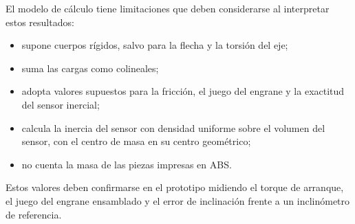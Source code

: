 \documentclass[../../General.tex]{subfiles}
\begin{document}
El modelo de cálculo tiene limitaciones que deben considerarse al interpretar estos resultados:
\begin{itemize}
    \item supone cuerpos rígidos, salvo para la flecha y la torsión del eje;
    \item suma las cargas como colineales;
    \item adopta valores supuestos para la fricción, el juego del engrane y la exactitud del sensor inercial;
    \item calcula la inercia del sensor con densidad uniforme sobre el volumen del sensor, con el centro de masa en su centro geométrico;
    \item no cuenta la masa de las piezas impresas en ABS.
\end{itemize}
Estos valores deben confirmarse en el prototipo midiendo el torque de arranque, el juego del engrane ensamblado y el error de inclinación frente a un inclinómetro de referencia.
\end{document}
